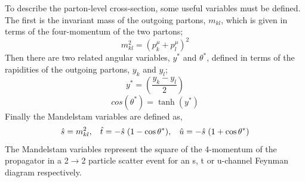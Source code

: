 To describe the parton-level cross-section, some useful variables must be defined.
The first is the invariant mass of the outgoing partons, $m_{kl}$, which is given in terms of the four-momentum of the two partons;
\begin{equation}
  m_{kl}^2 = (p^\mu_k + p^\mu_l)^2  
\end{equation}
\noindent
Then there are two related angular variables, $y^*$ and $\theta^*$,
defined in terms of the rapidities of the outgoing partons, $y_k$ and $y_l$;
\begin{equation}
  y^* = (\frac{y_k - y_l}{2})
\end{equation}
\begin{equation}
  cos(\theta^*) = \tanh(y^*)
\end{equation}
\noindent
Finally the Mandelstam variables are defined as, %
\begin{equation}
  \hat{s} = m_{kl}^2, \hspace{3mm}  \hat{t} = -\hat{s}\hspace{1mm}(1 - \cos{\theta^*}), \hspace{3mm} \hat{u} = - \hat{s}\hspace{1mm}(1+\cos{\theta^*})
  \label{eqn:theo-mandy}
\end{equation}
The Mandelstam variables represent the square of the 4-momentum of the propagator in a 2$\to$2 particle scatter event
for an s, t or u-channel Feynman diagram respectively.


